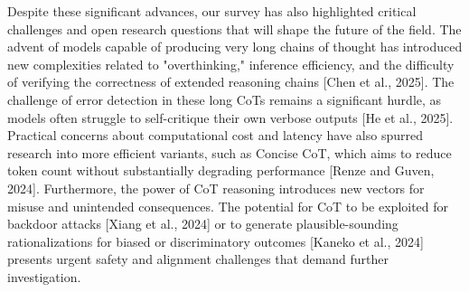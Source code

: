 \documentclass[11pt]{article}
\begin{document}
Despite these significant advances, our survey has also highlighted critical challenges and open research questions that will shape the future of the field. The advent of models capable of producing very long chains of thought has introduced new complexities related to "overthinking," inference efficiency, and the difficulty of verifying the correctness of extended reasoning chains [Chen et al., 2025]. The challenge of error detection in these long CoTs remains a significant hurdle, as models often struggle to self-critique their own verbose outputs [He et al., 2025]. Practical concerns about computational cost and latency have also spurred research into more efficient variants, such as Concise CoT, which aims to reduce token count without substantially degrading performance [Renze and Guven, 2024]. Furthermore, the power of CoT reasoning introduces new vectors for misuse and unintended consequences. The potential for CoT to be exploited for backdoor attacks [Xiang et al., 2024] or to generate plausible-sounding rationalizations for biased or discriminatory outcomes [Kaneko et al., 2024] presents urgent safety and alignment challenges that demand further investigation.
\end{document}
